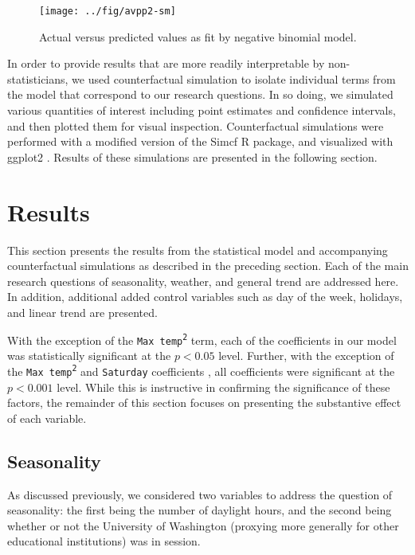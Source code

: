 \documentclass[12pt,letterpaper,article]{memoir}
\begin{document}
\begin{figure}[h!]
  \centering
  \texttt{[image: ../fig/avpp2-sm]}
  \caption{Actual versus predicted values as fit by negative binomial model.}
  \label{fg:avp}
\end{figure}

In order to provide results that are more readily interpretable by
non-statisticians, we used counterfactual simulation to isolate
individual terms from the model that correspond to our research
questions. In so doing, we simulated various quantities of interest
including point estimates and confidence intervals, and then plotted
them for visual inspection. Counterfactual simulations were performed
with a modified version of the Simcf R package, and visualized with
ggplot2 \parencite{Adolph:2014aa,Schmiedeskamp:aa,Wickham:2009aa}.
Results of these simulations are presented in the following section.

\chapter*{Results}
% 
% 
This section presents the results from the statistical model and
accompanying counterfactual simulations as described in the preceding
section. Each of the main research questions of seasonality, weather,
and general trend are addressed here. In addition, additional added
control variables such as day of the week, holidays, and linear trend
are presented.

With the exception of the \texttt{Max temp\textsuperscript{2}} term,
each of the coefficients in our model was statistically significant at
the $p < 0.05$ level. Further, with the exception of the \texttt{Max
  temp\textsuperscript{2}} and \texttt{Saturday} coefficients , all
coefficients were significant at the $p < 0.001$ level. While this is
instructive in confirming the significance of these factors, the
remainder of this section focuses on presenting the substantive effect
of each variable.

\FloatBarrier
\section*{Seasonality}
As discussed previously, we considered two variables to address the
question of seasonality: the first being the number of daylight hours,
and the second being whether or not the University of Washington
(proxying more generally for other educational institutions) was in
session.
\end{document}
